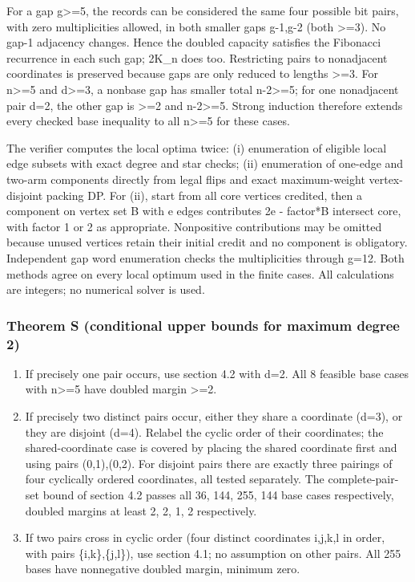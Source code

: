 \documentclass[
  10pt,
]{article}
\providecommand{\tightlist}{%
  \setlength{\itemsep}{0pt}\setlength{\parskip}{0pt}}
\begin{document}
For a gap g\textgreater=5, the records can be considered the same four
possible bit pairs, with zero multiplicities allowed, in both smaller
gaps g-1,g-2 (both \textgreater=3). No gap-1 adjacency changes. Hence
the doubled capacity satisfies the Fibonacci recurrence in each such
gap; 2K\_n does too. Restricting pairs to nonadjacent coordinates is
preserved because gaps are only reduced to lengths \textgreater=3. For
n\textgreater=5 and d\textgreater=3, a nonbase gap has smaller total
n-2\textgreater=5; for one nonadjacent pair d=2, the other gap is
\textgreater=2 and n-2\textgreater=5. Strong induction therefore extends
every checked base inequality to all n\textgreater=5 for these cases.

The verifier computes the local optima twice: (i) enumeration of
eligible local edge subsets with exact degree and star checks; (ii)
enumeration of one-edge and two-arm components directly from legal flips
and exact maximum-weight vertex-disjoint packing DP. For (ii), start
from all core vertices credited, then a component on vertex set B with e
edges contributes 2e - factor*\textbar B intersect core\textbar, with
factor 1 or 2 as appropriate. Nonpositive contributions may be omitted
because unused vertices retain their initial credit and no component is
obligatory. Independent gap word enumeration checks the multiplicities
through g=12. Both methods agree on every local optimum used in the
finite cases. All calculations are integers; no numerical solver is
used.

\subsubsection{Theorem S (conditional upper bounds for maximum degree
2)}\label{theorem-s-conditional-upper-bounds-for-maximum-degree-2}

\begin{enumerate}
\def\labelenumi{\arabic{enumi}.}
\tightlist
\item
  If precisely one pair occurs, use section 4.2 with d=2. All 8 feasible
  base cases with n\textgreater=5 have doubled margin \textgreater=2.
\item
  If precisely two distinct pairs occur, either they share a coordinate
  (d=3), or they are disjoint (d=4). Relabel the cyclic order of their
  coordinates; the shared-coordinate case is covered by placing the
  shared coordinate first and using pairs (0,1),(0,2). For disjoint
  pairs there are exactly three pairings of four cyclically ordered
  coordinates, all tested separately. The complete-pair-set bound of
  section 4.2 passes all 36, 144, 255, 144 base cases respectively,
  doubled margins at least 2, 2, 1, 2 respectively.
\item
  If two pairs cross in cyclic order (four distinct coordinates i,j,k,l
  in order, with pairs \{i,k\},\{j,l\}), use section 4.1; no assumption
  on other pairs. All 255 bases have nonnegative doubled margin, minimum
  zero.
\end{enumerate}
\end{document}
